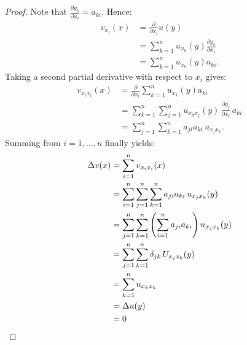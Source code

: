 \documentclass[10pt,oneside,openany]{memoir}
\begin{document}
    \begin{proof}
        Note that $\frac{\partial y_k}{\partial x_i} = a_{ki}$. Hence:
            \begin{equation*}
            \begin{split}
                v_{x_i}(x)
                & = \frac{\partial}{\partial x_i} u(y) \\
                & = \sum_{k = 1}^n u_{x_k}(y)\frac{\partial y_k}{\partial x_i} \\
                & = \sum_{k = 1}^n u_{x_k}(y) a_{ki}.
            \end{split}
            \end{equation*}
        Taking a second partial derivative with respect to $x_i$ gives:
            \begin{equation*}
            \begin{split}
                v_{x_i x_i}(x)
                & = \frac{\partial}{\partial x_i}\sum_{k = 1}^n u_{x_k}(y) a_{ki}\\
                &= \sum_{k=1}^n \sum_{j=1}^n u_{x_k x_j}(y)\,\frac{\partial y_j}{\partial x_i}\,a_{ki} \\
                &= \sum_{j=1}^n \sum_{k=1}^n a_{ji}a_{ki}\,u_{x_j x_k}.
            \end{split}
            \end{equation*}
        Summing from $i=1,...,n$ finally yields:
            \begin{equation*}
            \begin{split}
                \Delta v(x)
                &= \sum_{i=1}^n v_{x_i x_i}(x) \\
                &= \sum_{i=1}^n \sum_{j=1}^n \sum_{k=1}^n a_{ji}a_{ki}\,u_{x_j x_k}(y) \\
                &= \sum_{j=1}^n \sum_{k=1}^n \left( \sum_{i=1}^n a_{ji}a_{ki} \right) u_{x_j x_k}(y) \\
                &= \sum_{j=1}^n \sum_{k=1}^n \delta_{jk}\,U_{x_j x_k}(y) \\
                &= \sum_{k=1}^n u_{x_k x_k} \\
                &= \Delta u(y) \\
                &= 0 \qedhere
            \end{split}
            \end{equation*}
    \end{proof}
\end{document}
